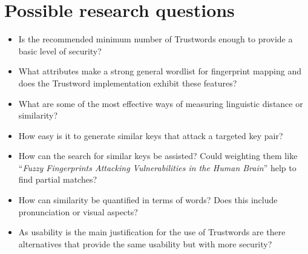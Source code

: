 \section{Possible research questions}
\begin{itemize}
    \item Is the recommended minimum number of Trustwords enough to provide a basic level of security?
    
    \item What attributes make a strong general wordlist for fingerprint mapping and does the Trustword implementation exhibit these features?
    
    \item What are some of the most effective ways of measuring linguistic distance or similarity?

    \item How easy is it to generate similar keys that attack a targeted key pair?
    
    \item How can the search for similar keys be assisted? Could weighting them like ``\textit{Fuzzy Fingerprints Attacking Vulnerabilities in the Human Brain}'' help to find partial matches?

    \item How can similarity be quantified in terms of words? Does this include pronunciation or visual aspects?
    
    \item As usability is the main justification for the use of Trustwords are there alternatives that provide the same usability but with more security?
\end{itemize}




